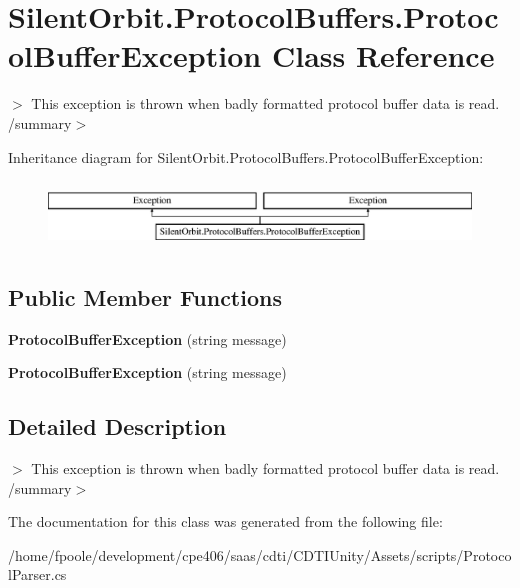 \hypertarget{class_silent_orbit_1_1_protocol_buffers_1_1_protocol_buffer_exception}{}\section{Silent\+Orbit.\+Protocol\+Buffers.\+Protocol\+Buffer\+Exception Class Reference}
\label{class_silent_orbit_1_1_protocol_buffers_1_1_protocol_buffer_exception}


$>$ This exception is thrown when badly formatted protocol buffer data is read. /summary$>$  


Inheritance diagram for Silent\+Orbit.\+Protocol\+Buffers.\+Protocol\+Buffer\+Exception\+:\begin{figure}[H]
\begin{center}
\leavevmode
\includegraphics[height=1.794872cm]{class_silent_orbit_1_1_protocol_buffers_1_1_protocol_buffer_exception}
\end{center}
\end{figure}
\subsection*{Public Member Functions}
\begin{DoxyCompactItemize}
\item 
\hypertarget{class_silent_orbit_1_1_protocol_buffers_1_1_protocol_buffer_exception_a6028c070a3feff745b455ff61e9fd616}{}{\bfseries Protocol\+Buffer\+Exception} (string message)\label{class_silent_orbit_1_1_protocol_buffers_1_1_protocol_buffer_exception_a6028c070a3feff745b455ff61e9fd616}

\item 
\hypertarget{class_silent_orbit_1_1_protocol_buffers_1_1_protocol_buffer_exception_a6028c070a3feff745b455ff61e9fd616}{}{\bfseries Protocol\+Buffer\+Exception} (string message)\label{class_silent_orbit_1_1_protocol_buffers_1_1_protocol_buffer_exception_a6028c070a3feff745b455ff61e9fd616}

\end{DoxyCompactItemize}


\subsection{Detailed Description}
$>$ This exception is thrown when badly formatted protocol buffer data is read. /summary$>$ 

The documentation for this class was generated from the following file\+:\begin{DoxyCompactItemize}
\item 
/home/fpoole/development/cpe406/saas/cdti/\+C\+D\+T\+I\+Unity/\+Assets/scripts/Protocol\+Parser.\+cs\end{DoxyCompactItemize}
